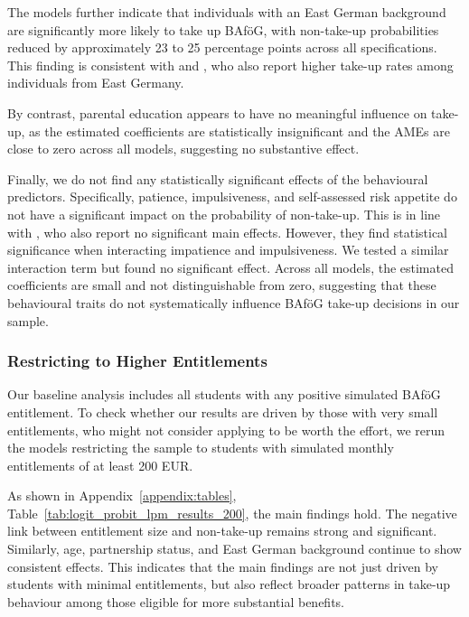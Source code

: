 The models further indicate that individuals with an East German background are significantly more likely to take up BAföG, with non-take-up probabilities reduced by approximately 23 to 25 percentage points across all specifications. 
This finding is consistent with \cite{herber_non-take-up_2019} and \cite{harnisch_nontakeup_2019}, who also report higher take-up rates among individuals from East Germany. 

By contrast, parental education appears to have no meaningful influence on take-up, as the estimated coefficients are statistically insignificant and the AMEs are close to zero across all models, suggesting no substantive effect.

Finally, we do not find any statistically significant effects of the behavioural predictors. 
Specifically, patience, impulsiveness, and self-assessed risk appetite do not have a significant impact on the probability of non-take-up. 
This is in line with \cite{herber_non-take-up_2019}, who also report no significant main effects. 
However, they find statistical significance when interacting impatience and impulsiveness. 
We tested a similar interaction term but found no significant effect. 
Across all models, the estimated coefficients are small and not distinguishable from zero, suggesting that these behavioural traits do not systematically influence BAföG take-up decisions in our sample.


\subsubsection{Restricting to Higher Entitlements}
Our baseline analysis includes all students with any positive simulated BAföG entitlement. 
To check whether our results are driven by those with very small entitlements, who might not consider applying to be worth the effort, we rerun the models restricting the sample to students with simulated monthly entitlements of at least 200 EUR.

As shown in Appendix~\ref{appendix:tables}, Table~\ref{tab:logit_probit_lpm_results_200}, the main findings hold. The negative link between entitlement size and non-take-up remains strong and significant. Similarly, age, partnership status, and East German background continue to show consistent effects. This indicates that the main findings are not just driven by students with minimal entitlements, but also reflect broader patterns in take-up behaviour among those eligible for more substantial benefits.
